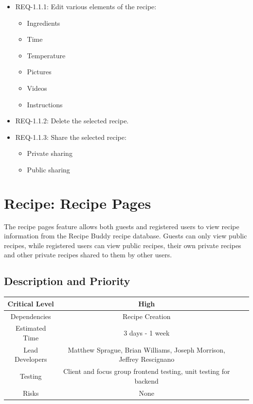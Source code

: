 \documentclass{scrreprt}
\begin{document}
\begin{itemize}
    \item REQ-1.1.1: Edit various elements of the recipe:
          \begin{itemize}
              \item Ingredients
              \item Time
              \item Temperature
              \item Pictures
              \item Videos
              \item Instructions
          \end{itemize}
    \item REQ-1.1.2: Delete the selected recipe.
    \item REQ-1.1.3: Share the selected recipe:
          \begin{itemize}
              \item Private sharing
              \item Public sharing
          \end{itemize}
\end{itemize}

\section{Recipe: Recipe Pages}

The recipe pages feature allows both guests and registered users to view recipe information from the Recipe Buddy recipe database. Guests can only view public recipes, while registered users can view public recipes, their own private recipes and other private recipes shared to them by other users.

\subsection{Description and Priority}
\begin{center}
    \begin{tabular}{| c | c | c | c |}
        \hline
        Critical Level  & High                                                                 \\
        \hline
        Dependencies    & Recipe Creation                                                      \\
        \hline
        Estimated Time  & 3 days - 1 week                                                      \\
        \hline
        Lead Developers & Matthew Sprague, Brian Williams, Joseph Morrison, Jeffrey Rescignano \\
        \hline
        Testing         & Client and focus group frontend testing, unit testing for backend    \\
        \hline
        Risks           & None                                                                 \\
        \hline
    \end{tabular}
\end{center}
\end{document}
